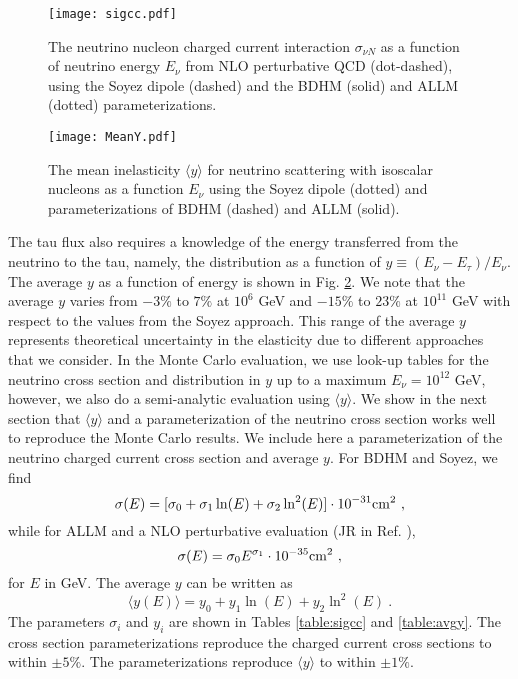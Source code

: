 \documentclass[aps,10pt,twocolumn,tightenlines]{revtex4-1}
\begin{document}
\begin{figure}[htb]
\centering
	\texttt{[image: sigcc.pdf]}
	\caption{The neutrino nucleon charged current interaction $\sigma_{\nu N}$ as a function of neutrino energy $E_\nu$ from NLO perturbative QCD \cite{Jeong:2010za} (dot-dashed), using the Soyez dipole (dashed) and the BDHM (solid) and ALLM (dotted) parameterizations.}
	\label{fig:sigcc}
\end{figure}
\begin{figure}[h]
\centering
	\texttt{[image: MeanY.pdf]}
	\caption{The mean inelasticity $\langle y\rangle$ for neutrino scattering with isoscalar nucleons as a function $E_\nu$ using the Soyez dipole (dotted) and parameterizations of BDHM (dashed) and ALLM (solid).}
	\label{fig:meany}
\end{figure}

The tau flux also requires a knowledge of the energy transferred from the neutrino to the tau, 
namely, the distribution as a function of 
$y\equiv (E_\nu-E_\tau)/E_\nu$. The average $y$ as a function of 
energy is shown in Fig. \ref{fig:meany}. 
We note that the average $y$ varies from 
$-3\%$ to $ 7\%$ at $10^6$ GeV and $-15\%$ to $23\%$ at $10^{11}$ GeV 
with respect to the values from the Soyez approach.  This range of the 
average $y$ represents theoretical uncertainty in the elasticity due to different approaches that we consider. 
In the Monte Carlo evaluation, we use look-up tables for the neutrino cross section
and distribution in $y$ up to a maximum $E_\nu=10^{12}$ GeV, however, we also do a semi-analytic evaluation
using $\langle y\rangle$.
We show in the next section that $\langle y\rangle$ and a parameterization of the neutrino cross section works well
to reproduce the Monte Carlo results. We include here a parameterization of the neutrino charged current cross section and average $y$. For BDHM and Soyez, we find
\begin{equation}
\label{eq:sigfit}
\sigma (E) =  [\sigma_0 + \sigma_1 \ln (E) + \sigma_2 \ln^2(E) ]\cdot 10^{-31} {\rm cm^2}\ ,
\end{equation}
while for ALLM and a NLO perturbative evaluation (JR in Ref. \cite{Jeong:2010za}),
\begin{equation}
\label{eq:sigfit-a}
\sigma (E) =\sigma_{0}   E^{\sigma_{1}}  \cdot 10^{-35} {\rm cm^2} \ ,
\end{equation}
for $E$ in GeV.
The average $y$ can be written as
\begin{equation}
\label{eq:meany}
\langle y (E) \rangle  = y_0 + y_1 \ln (E) + y_2 \ln^2(E)\ .
\end{equation}
The parameters $\sigma_i$ and $y_i$ are shown 
in Tables \ref{table:sigcc} and \ref{table:avgy}. 
The cross section parameterizations reproduce the charged current 
cross sections to within $\pm 5\%$. The parameterizations reproduce 
$\langle y\rangle$ to within $\pm 1\%$.
\end{document}
